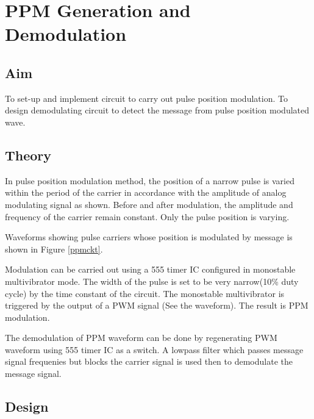 \chapter[PPM Generation and Demodulation]{PPM Generation and Demodulation}

\section*{Aim}

To set-up and implement circuit to carry out pulse position modulation. To design demodulating circuit to detect the message from pulse position modulated wave.
\section*{Theory}
In pulse position modulation method, the position of a narrow pulse is varied within the period of the carrier in accordance with the amplitude of analog modulating signal as shown. Before and after modulation, the amplitude and frequency of the carrier remain constant. Only the pulse position is varying.

Waveforms showing pulse carriers whose position is modulated by message is shown in Figure \ref{ppmckt}.

Modulation can be carried out using a 555 timer IC configured in monostable multivibrator mode. The width of the pulse is set to be very narrow(10\% duty cycle) by the time constant of the circuit. The monostable multivibrator is triggered by  the output of a PWM signal (See the waveform).  The result is PPM modulation.

The demodulation of PPM waveform can be done by regenerating PWM waveform using 555 timer IC as a switch. A lowpass filter which passes message signal frequenies but blocks the carrier signal is used then to demodulate the message signal.

%

\section*{Design}
